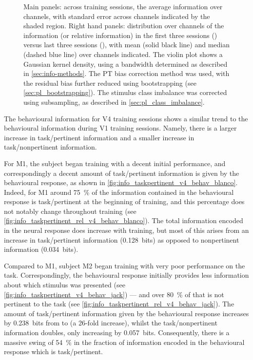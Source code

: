 \begin{figure}[htbp]
{Main panels: across training sessions, the average information over channels, with standard error across channels indicated by the shaded region.
Right hand panels: distribution over channels of the information (or relative information) in the first three sessions () versus last three sessions (), with mean (solid black line) and median (dashed blue line) over channels indicated.
The violin plot shows a Gaussian kernel density, using a bandwidth determined as described in \autoref{sec:info-methods}.
The \ac{PT} bias correction method was used, with the residual bias further reduced using bootstrapping (see \autoref{sec:pl_bootstrapping}).
The stimulus class imbalance was corrected using subsampling, as described in \autoref{sec:pl_class_imbalance}.
    \label{fig:info_taskpertinent_v4_ch}
}
\end{figure}


The behavioural information for \ac{V4} training sessions shows a similar trend to the behavioural information during \ac{V1} training sessions.
Namely, there is a larger increase in task\-/pertinent information and a smaller increase in task\-/nonpertinent information.

For \ac{M1}, the subject began training with a decent initial performance, and correspondingly a decent amount of task\-/pertinent information is given by the behavioural response, as shown in \autoref{fig:info_taskpertinent_v4_behav_blanco}.
Indeed, for \ac{M1} around \SI{75}{\percent} of the information contained in the behavioural response is task\-/pertinent at the beginning of training, and this percentage does not notably change throughout training (see \autoref{fig:info_taskpertinent_rel_v4_behav_blanco}).
The total information encoded in the neural response does increase with training, but most of this arises from an increase in task\-/pertinent information (\SI{+0.128}{bits}) as opposed to nonpertinent information (\SI{+0.034}{bits}).

Compared to \ac{M1}, subject \ac{M2} began training with very poor performance on the task.
Correspondingly, the behavioural response initially provides less information about which stimulus was presented (see \autoref{fig:info_taskpertinent_v4_behav_jack}) --- and over \SI{80}{\percent} of that is not pertinent to the task (see \autoref{fig:info_taskpertinent_rel_v4_behav_jack}).
The amount of task\-/pertinent information given by the behavioural response increases by \SI{0.238}{bits} from  to  (a 26-fold increase), whilst the task\-/nonpertinent information doubles, only increasing by \SI{0.057}{bits}.
Consequently, there is a massive swing of \SI{+54}{\percent} in the fraction of information encoded in the behavioural response which is task\-/pertinent.

